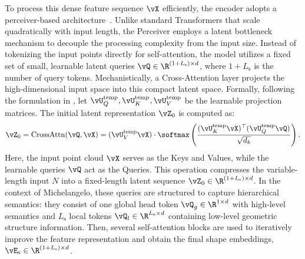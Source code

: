 \documentclass[../../book-main.tex]{subfiles}
\begin{document}
To process this dense feature sequence \(\vX\) efficiently, 
the encoder adopts a 
perceiver-based architecture~\citep{pmlr-v139-jaegle21a}.
Unlike 
standard Transformers that scale quadratically with input length, 
the Perceiver employs a latent bottleneck mechanism to decouple 
the processing complexity from the input size.
Instead of tokenizing the
input points directly for self-attention, the model utilizes a fixed set 
of small, learnable latent queries \(\vQ \in \R^{(1+L_{\mathrm{s}}) \times d}\), where \(1 + L_{\mathrm{s}}\) is the number of query tokens.
Mechanistically, a Cross-Attention layer projects the high-dimensional 
input space into this compact latent space.
Formally, following the formulation in , let \(\vU^{\mathrm{temp}}_{Q}, \vU^{\mathrm{temp}}_{K}, \vU^{\mathrm{temp}}_{V}\) be the learnable projection matrices.
The initial latent 
representation \(\vZ_0\) is computed as:
\begin{equation}
\vZ_0 = \mathrm{CrossAttn}(\vQ, \vX) = (\vU^{\mathrm{temp}}_{V}\vX) \cdot \softmax\left(\frac{(\vU^{\mathrm{temp}}_{K}\vX)^\top(\vU^{\mathrm{temp}}_{Q}\vQ)}
{\sqrt{d_k}}\right) .
\end{equation}
Here, the input point cloud \(\vX\) serves 
as the Keys and Values, while the learnable queries \(\vQ\) act as the 
Queries.
This operation compresses the variable-length input \(N\) into a 
fixed-length latent sequence \(\vZ_0 \in \R^{(1+L_{\mathrm{s}}) \times d}\).
In the context of Michelangelo, these queries are structured to 
capture hierarchical semantics: they consist of one global head token \(\vQ_g \in \R^{1 \times d}\) with high-level semantics and 
\(L_{\mathrm{s}}\) local tokens \(\vQ_l \in \R^{L_{\mathrm{s}} \times d}\) 
containing low-level geometric structure information.
Then, several self-attention blocks are used to iteratively improve the feature 
representation and obtain the final shape embeddings, \(\vE_{\mathrm{s}} \in \R^{(1+L_{\mathrm{s}}) \times d}\).
\end{document}
